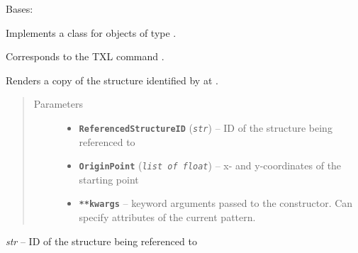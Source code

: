 \documentclass[letterpaper,10pt,english]{sphinxmanual}
\begin{document}

\begin{fulllineitems}
\label{Chapters/PythonModuleReference/Patterns/TXLWizard.Patterns.Reference:TXLWizard.Patterns.Reference.Reference}
Bases: {\hyperref[Chapters/PythonModuleReference/Patterns/TXLWizard.Patterns.AbstractPattern:TXLWizard.Patterns.AbstractPattern.AbstractPattern]{}}

Implements a class for  objects of type .

Corresponds to the TXL command .

Renders a copy of the structure identified by  at .
\begin{quote}\begin{description}
\item[{Parameters}] \leavevmode\begin{itemize}
\item {} 
\textbf{\texttt{ReferencedStructureID}} (\emph{\texttt{str}}) -- ID of the structure being referenced to

\item {} 
\textbf{\texttt{OriginPoint}} (\emph{\texttt{list of float}}) -- x- and y-coordinates of the starting point

\item {} 
\textbf{\texttt{**kwargs}} -- keyword arguments passed to the {\hyperref[Chapters/PythonModuleReference/Patterns/TXLWizard.Patterns.AbstractPattern:TXLWizard.Patterns.AbstractPattern.AbstractPattern]{}} constructor.
Can specify attributes of the current pattern.

\end{itemize}

\end{description}\end{quote}

\begin{fulllineitems}
\label{Chapters/PythonModuleReference/Patterns/TXLWizard.Patterns.Reference:TXLWizard.Patterns.Reference.Reference.ReferencedStructureID}
\emph{str} -- ID of the structure being referenced to


\end{fulllineitems}
\end{fulllineitems}
\end{document}
